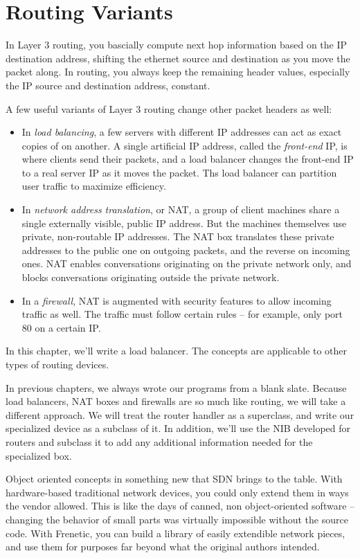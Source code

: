 \chapter{Routing Variants}

In Layer 3 routing, you bascially compute next hop information based on the IP destination address,
shifting the ethernet source and destination as you move the packet along.  In routing, you 
always keep the remaining header values, especially the IP source and destination address, 
constant. 

A few useful variants of Layer 3 routing change other packet headers as well:

\begin{itemize}
\item In \emph{load balancing}, a few servers with different IP addresses can act as exact copies
of on another.  A single artificial IP address, called the \emph{front-end} IP, is where clients send their
packets, and a load balancer changes the front-end IP to a real server IP as it moves the packet.
Ths load balancer can partition user traffic to maximize efficiency.
\item In \emph{network address translation}, or NAT, a group of client machines share a single
externally visible, public IP address.  But the machines themselves use private, non-routable
IP addresses.  The NAT box translates these private addresses to the public one on outgoing packets,
and the reverse on incoming ones.   NAT enables conversations originating on the private
network only, and blocks conversations originating outside the private network.  
\item In a \emph{firewall}, NAT is augmented with security features to allow incoming traffic
as well.  The traffic must follow certain rules -- for example, only port 80 on a certain IP.  
\end{itemize}

In this chapter, we'll write a load balancer.  The concepts are applicable to other 
types of routing devices.  

In previous chapters, we always wrote our programs from a blank slate.  Because load balancers, 
NAT boxes and firewalls are so much like routing, we will take a different approach.  We will
treat the router handler as a superclass, and write our specialized device as a subclass of it.
In addition, we'll use the NIB developed for routers and subclass it to add any additional 
information needed for the specialized box.  

Object oriented concepts in something new that SDN brings to the table.  With hardware-based
traditional network devices, you could only extend them in ways the vendor allowed.  This is 
like the days of canned, non object-oriented software -- changing the behavior of small 
parts was virtually impossible without the source code.  With Frenetic, you can build a library
of easily extendible network pieces, and use them for purposes far beyond what the original
authors intended. 

